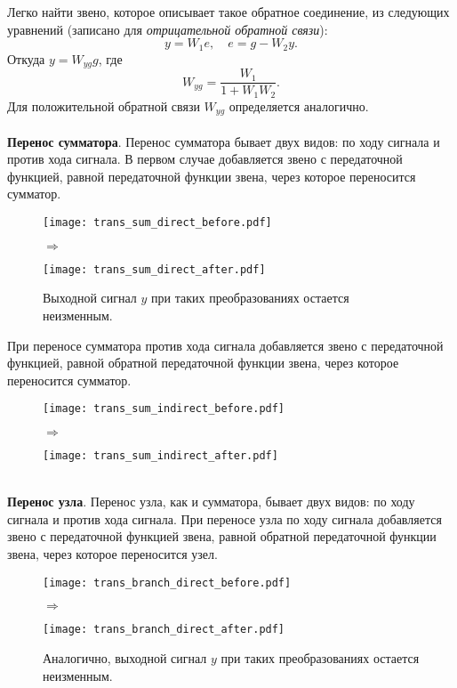 \documentclass[../../TAU.tex]{subfiles}
\begin{document}
    Легко найти звено, которое описывает такое обратное соединение, из следующих уравнений (записано для {\it отрицательной обратной связи}):
    $$
        y = W_1 e, \quad e = g- W_2 y.
    $$
    Откуда ${y = W_{yg}g}$, где
    $$
        W_{yg} = \frac{W_1}{1+W_1 W_2}.
    $$
    Для положительной обратной связи $W_{yg}$ определяется аналогично.\\\\
    {\bf Перенос сумматора}. Перенос сумматора бывает двух видов: по ходу сигнала и против хода сигнала. В первом случае добавляется звено с передаточной функцией, равной передаточной функции звена, через которое переносится сумматор.

    \begin{figure}[h]
        \begin{minipage}[h]{0.45\linewidth}
            \texttt{[image: trans\_sum\_direct\_before.pdf]}
        \end{minipage}
        $\Longrightarrow$
        \begin{minipage}[h]{0.45\linewidth}
            \texttt{[image: trans\_sum\_direct\_after.pdf]}
        \end{minipage}
        \caption{Выходной сигнал $y$ при таких преобразованиях остается неизменным.}
    \end{figure}
    При переносе сумматора против хода сигнала добавляется звено с передаточной функцией, равной обратной передаточной функции звена, через которое переносится сумматор.  
    \begin{figure}[h]
        \begin{minipage}[h]{0.45\linewidth}
           \texttt{[image: trans\_sum\_indirect\_before.pdf]}
        \end{minipage}
        $\Longrightarrow$
        \begin{minipage}[h]{0.45\linewidth}
            \texttt{[image: trans\_sum\_indirect\_after.pdf]}
        \end{minipage}
    \end{figure}\\
    {\bf Перенос узла}. Перенос узла, как и сумматора, бывает двух видов: по ходу сигнала и против хода сигнала. При переносе узла по ходу сигнала добавляется звено с передаточной функцией звена, равной обратной передаточной функции звена, через которое переносится узел.
    \begin{figure}[h]
        \begin{minipage}[h]{0.45\linewidth}
            \texttt{[image: trans\_branch\_direct\_before.pdf]}
        \end{minipage}
    $\Longrightarrow$
        \begin{minipage}[h]{0.45\linewidth}
            \texttt{[image: trans\_branch\_direct\_after.pdf]}
        \end{minipage}
        \caption{Аналогично, выходной сигнал $y$ при таких преобразованиях остается неизменным.}
    \end{figure}
\end{document}
